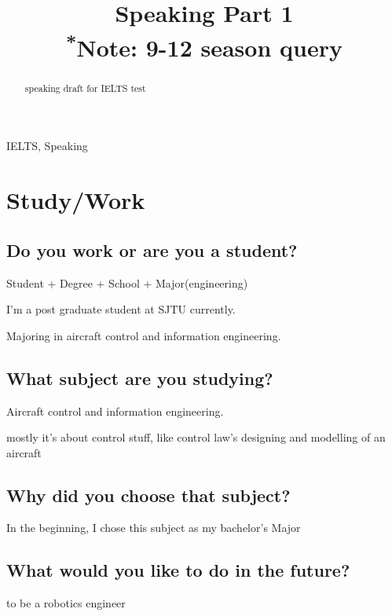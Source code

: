 \documentclass[conference]{IEEEtran}
\begin{document}
\title{Speaking Part 1\\
{\footnotesize \textsuperscript{*}Note:
9-12 season query}
}

\author{
}

\maketitle

\begin{abstract}
speaking draft for IELTS test
\end{abstract}

\begin{IEEEkeywords}
IELTS, Speaking
\end{IEEEkeywords}


\section{Study/Work}

\subsection{Do you work or are you a student?}
Student + Degree + School + Major(engineering)

I'm a post graduate student at SJTU currently.

Majoring in aircraft control and information engineering. 


\subsection{What subject are you studying?}
Aircraft control and information engineering.

mostly it's about control stuff, like control law's designing and modelling of an aircraft

\subsection{Why did you choose that subject?}
In the beginning, I chose this subject as my bachelor's Major



\subsection{What would you like to do in the future?}
to be a robotics engineer
\end{document}
